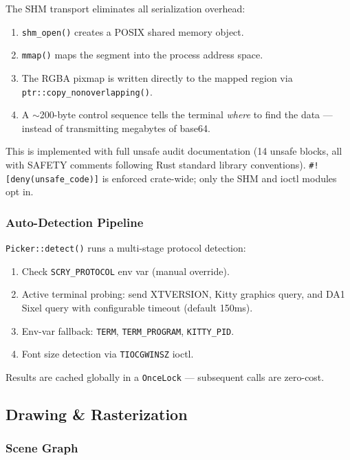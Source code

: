 \documentclass[11pt,a4paper]{article}
\begin{document}
The SHM transport eliminates all serialization overhead:

\begin{enumerate}[nosep]
    \item \texttt{shm\_open()} creates a POSIX shared memory object.
    \item \texttt{mmap()} maps the segment into the process address space.
    \item The RGBA pixmap is written directly to the mapped region
          via \texttt{ptr::copy\_nonoverlapping()}.
    \item A $\sim$200-byte control sequence tells the terminal
          \emph{where} to find the data --- instead of transmitting
          megabytes of base64.
\end{enumerate}

This is implemented with full unsafe audit documentation (14 unsafe
blocks, all with SAFETY comments following Rust standard library
conventions). \texttt{\#![deny(unsafe\_code)]} is enforced crate-wide;
only the SHM and ioctl modules opt in.

\subsubsection{Auto-Detection Pipeline}

\texttt{Picker::detect()} runs a multi-stage protocol detection:

\begin{enumerate}[nosep]
    \item Check \texttt{SCRY\_PROTOCOL} env var (manual override).
    \item Active terminal probing: send XTVERSION, Kitty graphics query,
          and DA1 Sixel query with configurable timeout (default 150ms).
    \item Env-var fallback: \texttt{TERM}, \texttt{TERM\_PROGRAM},
          \texttt{KITTY\_PID}.
    \item Font size detection via \texttt{TIOCGWINSZ} ioctl.
\end{enumerate}

Results are cached globally in a \texttt{OnceLock} --- subsequent calls
are zero-cost.

\subsection{Drawing \& Rasterization}

\subsubsection{Scene Graph}
\end{document}
